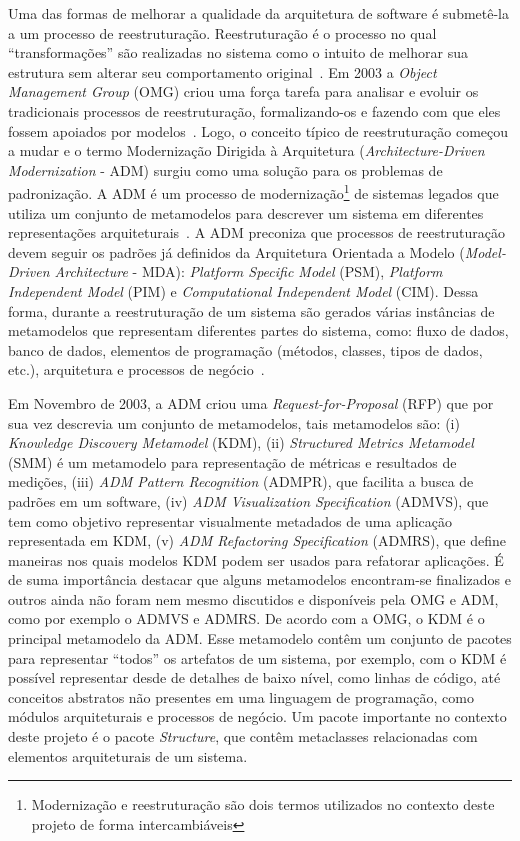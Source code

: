 \documentclass[12pt]{article}
\begin{document}
Uma das formas de melhorar a qualidade da arquitetura de software é submetê-la a um processo de reestruturação. Reestruturação é o processo no qual ``transformações'' são realizadas no sistema como o intuito de melhorar sua estrutura sem alterar seu comportamento original~\cite{Canfora2011}. Em 2003 a \textit{Object Management Group} (OMG) criou uma força tarefa para analisar e evoluir os tradicionais processos de reestruturação, formalizando-os e fazendo com que eles fossem apoiados por modelos~\cite{OMGADM}. Logo, o conceito típico de reestruturação começou a mudar e o termo Modernização Dirigida à Arquitetura (\textit{Architecture-Driven Modernization} - ADM) surgiu como uma solução para os problemas de padronização. A ADM é um processo de modernização\footnote{Modernização e reestruturação são dois termos utilizados no contexto deste projeto de forma intercambiáveis} de sistemas legados que utiliza um conjunto de metamodelos para descrever um sistema em diferentes representações arquiteturais~\cite{ADM:OMG}. A ADM preconiza que processos de reestruturação devem seguir os padrões já definidos da Arquitetura Orientada a Modelo (\textit{Model-Driven Architecture} - MDA): \textit{Platform Specific Model} (PSM), \textit{Platform Independent Model} (PIM) e \textit{Computational Independent Model} (CIM). Dessa forma, durante a reestruturação de um sistema são gerados várias instâncias de metamodelos que representam diferentes partes do sistema, como: fluxo de dados, banco de dados, elementos de programação (métodos, classes, tipos de dados, etc.), arquitetura e processos de negócio~\cite{Kleppe:2003, PerezCastillo:2011jo}. 

Em Novembro de 2003, a ADM criou uma \textit{Request-for-Proposal} (RFP) que por sua vez descrevia um conjunto de metamodelos, tais metamodelos são: (i) \textit{Knowledge Discovery Metamodel} (KDM), (ii) \textit{Structured Metrics Metamodel} (SMM) é um metamodelo para representação de métricas e resultados de medições, (iii) \textit{ADM Pattern Recognition} (ADMPR), que facilita a busca de padrões em um software, (iv) \textit{ADM Visualization Specification} (ADMVS), que tem como objetivo representar visualmente metadados de uma aplicação representada em KDM, (v) \textit{ADM Refactoring Specification} (ADMRS), que define maneiras nos quais modelos KDM podem ser usados para refatorar aplicações. É de suma importância destacar que alguns metamodelos encontram-se finalizados e outros ainda não foram nem mesmo discutidos e disponíveis pela OMG e ADM, como por exemplo o ADMVS e ADMRS. De acordo com a OMG, o KDM é o principal metamodelo da ADM. Esse metamodelo contêm um conjunto de pacotes para representar ``todos'' os artefatos de um sistema, por exemplo, com o KDM é possível representar desde de detalhes de baixo nível, como linhas de código, até conceitos abstratos não presentes em uma linguagem de programação, como módulos arquiteturais e processos de negócio. Um pacote importante no contexto deste projeto é o pacote \textit{Structure}, que contêm metaclasses relacionadas com elementos arquiteturais de um sistema.
\end{document}
